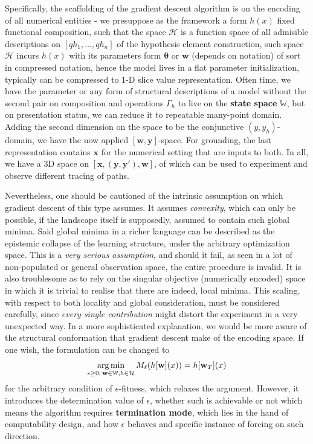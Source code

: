 Specifically, the scaffolding of the gradient descent algorithm is on the encoding of all numerical entities - we presuppose as the framework a form $h(x)$ fixed functional composition, such that the space $\mathcal{H}$ is a function space of all admisible descriptions on $[qh_{1},\dots,qh_{n}]$ of the hypothesis element construction, such space $\mathcal{H}$ incurs $h(x)$ with its parameters form $\bm{\theta}$ or $\mathbf{w}$ (depends on notation) of sort in compressed notation, hence the model lives in a flat parameter initialization, typically can be compressed to 1-D slice value representation. Often time, we have the parameter or any form of structural descriptions of a model without the second pair on composition and operations $\Gamma_{h}$ to live on the \textbf{state space} $\mathbb{W}$, but on presentation status, we can reduce it to repeatable many-point domain. Adding the second dimension on the space to be the conjunctive $(y,y_{h})$-domain, we have the now applied $[\mathbf{w},\mathbf{y}]$-space. For grounding, the last representation contains $\mathbf{x}$ for the numerical setting that are inputs to both. In all, we have a 3D space on $[\mathbf{x},(\mathbf{y},\mathbf{y}'),\mathbf{w}]$, of which can be used to experiment and observe different tracing of paths. 


Nevertheless, one should be cautioned of the intrinsic assumption on which gradient descent of this type assumes. It assumes \textit{convexity}, which can only be possible, if the landscape itself is supposedly, assumed to contain such global minima. Said global minima in a richer language can be described as the epistemic collapse of the learning structure, under the arbitrary optimization space. This is a \textit{very serious assumption}, and should it fail, as seen in a lot of non-populated or general observation space, the entire procedure is invalid. It is also troublesome as to rely on the singular objective (numerically encoded) space in which it is trivial to realise that there are indeed, local minima. This scaling, with respect to both locality and global consideration, must be considered carefully, since \textit{every single contribution} might distort the experiment in a very unexpected way. In a more sophisticated explanation, we would be more aware of the structural conformation that gradient descent make of the encoding space. If one wish, the formulation can be changed to 
\begin{equation}
    \operatorname*{arg\,min}_{\epsilon\geq 0;\:\mathbf{w}\in\mathbb{W},h\in\mathcal{H}} M_{\ell}(h[\mathbf{w}](x))=h[\mathbf{w}_{T}](x)
\end{equation}
for the arbitrary condition of $\epsilon$-fitness, which relaxes the argument. However, it introduces the determination value of $\epsilon$, whether such is achievable or not which means the algorithm requires \textbf{termination mode}, which lies in the hand of computability design, and how $\epsilon$ behaves and specific instance of forcing on such direction. 
